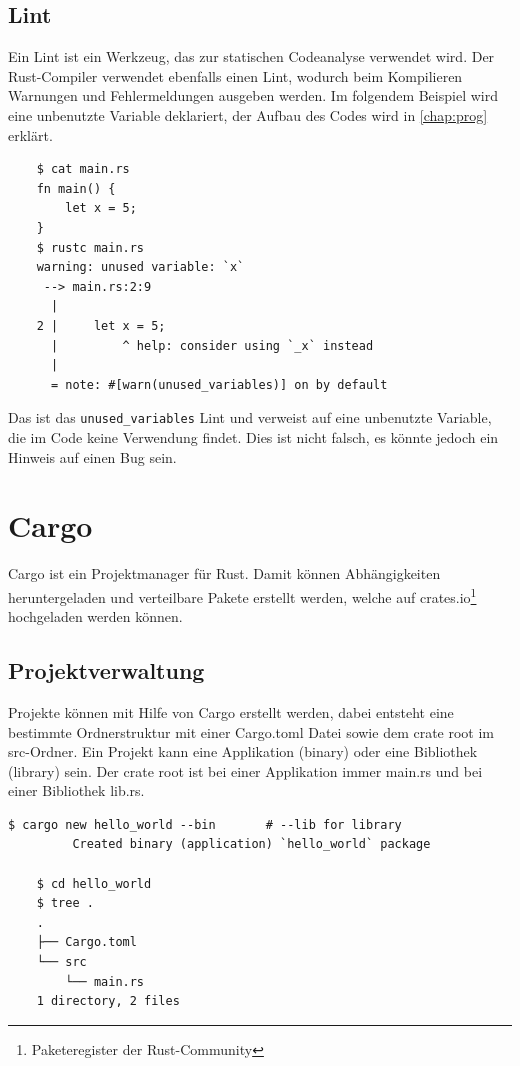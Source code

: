 \subsection{Lint}

Ein Lint ist ein Werkzeug, das zur statischen Codeanalyse verwendet wird. Der Rust-Compiler verwendet ebenfalls einen Lint, wodurch beim Kompilieren Warnungen und Fehlermeldungen ausgeben werden. Im folgendem Beispiel wird eine unbenutzte Variable deklariert, der Aufbau des Codes wird in \autoref{chap:prog} erklärt.

\begin{lstlisting}
    $ cat main.rs
    fn main() {
        let x = 5;
    }
    $ rustc main.rs
    warning: unused variable: `x`
     --> main.rs:2:9
      |
    2 |     let x = 5;
      |         ^ help: consider using `_x` instead
      |
      = note: #[warn(unused_variables)] on by default
\end{lstlisting}

Das ist das \verb"unused_variables" Lint und verweist auf eine unbenutzte Variable, die im Code keine Verwendung findet. Dies ist nicht falsch, es könnte jedoch ein Hinweis auf einen Bug sein.


\section{Cargo}

Cargo ist ein Projektmanager für Rust. Damit können Abhängigkeiten heruntergeladen und verteilbare Pakete erstellt werden, welche auf crates.io\footnote{Paketeregister der Rust-Community} hochgeladen werden können. \cite{CargoBook}

\subsection{Projektverwaltung}

Projekte können mit Hilfe von Cargo erstellt werden, dabei entsteht eine bestimmte Ordnerstruktur mit einer Cargo.toml Datei sowie dem crate root im src-Ordner. Ein Projekt kann eine Applikation (binary) oder eine Bibliothek (library) sein. Der crate root ist bei einer Applikation immer \glqq main.rs\grqq{} und bei einer Bibliothek \glqq lib.rs\grqq{}.

\begin{lstlisting}[style=tree]
    $ cargo new hello_world --bin       # --lib for library
         Created binary (application) `hello_world` package

    $ cd hello_world
    $ tree .
    .
    ├── Cargo.toml
    └── src
        └── main.rs
    1 directory, 2 files
\end{lstlisting}

